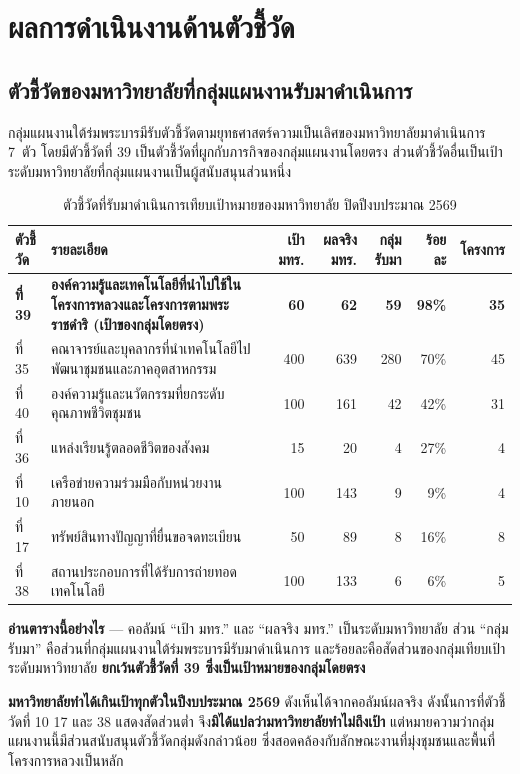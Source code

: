 \chapter{ผลการดำเนินงานด้านตัวชี้วัด}

\section{ตัวชี้วัดของมหาวิทยาลัยที่กลุ่มแผนงานรับมาดำเนินการ}
กลุ่มแผนงานใต้ร่มพระบารมีรับตัวชี้วัดตามยุทธศาสตร์ความเป็นเลิศของมหาวิทยาลัยมาดำเนินการ 7~ตัว
โดยมีตัวชี้วัดที่ 39 เป็นตัวชี้วัดที่ผูกกับภารกิจของกลุ่มแผนงานโดยตรง
ส่วนตัวชี้วัดอื่นเป็นเป้าระดับมหาวิทยาลัยที่กลุ่มแผนงานเป็นผู้สนับสนุนส่วนหนึ่ง

\begin{table}[H]
\centering
\caption{ตัวชี้วัดที่รับมาดำเนินการเทียบเป้าหมายของมหาวิทยาลัย ปิดปีงบประมาณ 2569}
\footnotesize
\begin{tabular}{L{1.25cm}L{4.35cm}rrrrr}
\toprule
{}
\textbf{ตัวชี้วัด} & \textbf{รายละเอียด} & \textbf{เป้า มทร.} & \textbf{ผลจริง มทร.} & \textbf{กลุ่มรับมา} & \textbf{ร้อยละ} & \textbf{โครงการ}\\
\midrule
{}
\textbf{ที่ 39} & \textbf{องค์ความรู้และเทคโนโลยีที่นำไปใช้ในโครงการหลวงและโครงการตามพระราชดำริ (เป้าของกลุ่มโดยตรง)} & \textbf{60} & \textbf{62} & \textbf{59} & \textbf{98\%} & \textbf{35}\\
ที่ 35 & คณาจารย์และบุคลากรที่นำเทคโนโลยีไปพัฒนาชุมชนและภาคอุตสาหกรรม & 400 & 639 & 280 & 70\% & 45\\
ที่ 40 & องค์ความรู้และนวัตกรรมที่ยกระดับคุณภาพชีวิตชุมชน & 100 & 161 & 42 & 42\% & 31\\
ที่ 36 & แหล่งเรียนรู้ตลอดชีวิตของสังคม & 15 & 20 & 4 & 27\% & 4\\
ที่ 10 & เครือข่ายความร่วมมือกับหน่วยงานภายนอก & 100 & 143 & 9 & 9\% & 4\\
ที่ 17 & ทรัพย์สินทางปัญญาที่ยื่นขอจดทะเบียน & 50 & 89 & 8 & 16\% & 8\\
ที่ 38 & สถานประกอบการที่ได้รับการถ่ายทอดเทคโนโลยี & 100 & 133 & 6 & 6\% & 5\\
\bottomrule
\end{tabular}
\end{table}

\begin{infobox}
\textbf{อ่านตารางนี้อย่างไร} --- คอลัมน์ ``เป้า มทร.'' และ ``ผลจริง มทร.'' เป็นระดับมหาวิทยาลัย
ส่วน ``กลุ่มรับมา'' คือส่วนที่กลุ่มแผนงานใต้ร่มพระบารมีรับมาดำเนินการ
และร้อยละคือสัดส่วนของกลุ่มเทียบเป้าระดับมหาวิทยาลัย
\textbf{ยกเว้นตัวชี้วัดที่ 39 ซึ่งเป็นเป้าหมายของกลุ่มโดยตรง}

\textbf{มหาวิทยาลัยทำได้เกินเป้าทุกตัวในปีงบประมาณ 2569} ดังเห็นได้จากคอลัมน์ผลจริง
ดังนั้นการที่ตัวชี้วัดที่ 10 17 และ 38 แสดงสัดส่วนต่ำ จึง\textbf{มิได้แปลว่ามหาวิทยาลัยทำไม่ถึงเป้า}
แต่หมายความว่ากลุ่มแผนงานนี้มีส่วนสนับสนุนตัวชี้วัดกลุ่มดังกล่าวน้อย
ซึ่งสอดคล้องกับลักษณะงานที่มุ่งชุมชนและพื้นที่โครงการหลวงเป็นหลัก
\end{infobox}

